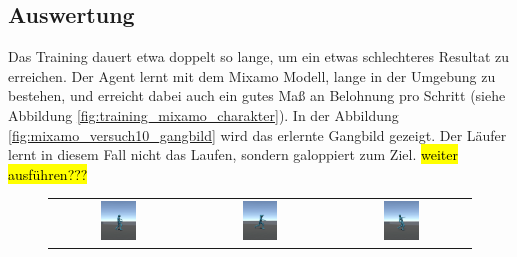 \subsection{Auswertung}
Das Training dauert etwa doppelt so lange, um ein etwas schlechteres Resultat zu erreichen. Der Agent lernt mit dem Mixamo Modell, lange in der Umgebung zu bestehen, und erreicht dabei auch ein gutes Maß an Belohnung pro Schritt (siehe Abbildung \ref{fig:training_mixamo_charakter}). In der Abbildung \ref{fig:mixamo_versuch10_gangbild} wird das erlernte Gangbild gezeigt. Der Läufer lernt in diesem Fall nicht das Laufen, sondern galoppiert zum Ziel. \hl{weiter ausführen???}

\begin{figure}[H]
  \centering
  \begin{tabular}{ccc}
    \includegraphics[width=0.27\textwidth]{img/charakter_mixamo_galoppieren1} & \includegraphics[width=0.27\textwidth]{img/charakter_mixamo_galoppieren2} & \includegraphics[width=0.27\textwidth]{img/charakter_mixamo_galoppieren3} \\

\end{tabular}
\end{figure}
